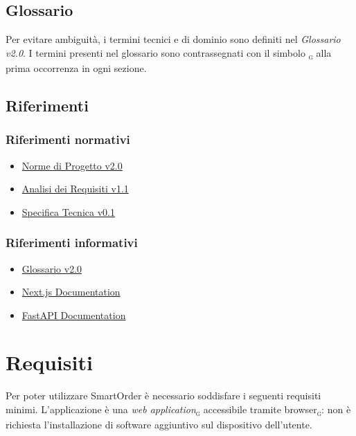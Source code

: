 \documentclass[a4paper, 11pt, oneside]{scrartcl}
\begin{document}
\subsection{Glossario}
Per evitare ambiguit\`a, i termini tecnici e di dominio sono definiti nel \textit{Glossario v2.0}.
I termini presenti nel glossario sono contrassegnati con il simbolo \textsubscript{\textsc{g}} alla prima occorrenza in ogni sezione.

\subsection{Riferimenti}

\subsubsection{Riferimenti normativi}
\begin{itemize}
    \item \href{https://swenightpro.github.io/Documentazione/docs/RTB/Documentazione%20Interna/Norme_di_Progetto_v2.0.pdf}{Norme di Progetto v2.0}
    \item \href{https://swenightpro.github.io/Documentazione/docs/RTB/Documentazione%20Esterna/Analisi_dei_Requisiti_v1.1.pdf}{Analisi dei Requisiti v1.1}
    \item \href{https://swenightpro.github.io/Documentazione/docs/PB/Documentazione%20Esterna/Specifica_Tecnica_v0.1.pdf}{Specifica Tecnica v0.1}
\end{itemize}

\subsubsection{Riferimenti informativi}
\begin{itemize}
    \item \href{https://swenightpro.github.io/Documentazione/docs/RTB/Documentazione%20Esterna/Glossario_v2.0.pdf}{Glossario v2.0}
    \item \href{https://nextjs.org/docs}{Next.js Documentation}
    \item \href{https://fastapi.tiangolo.com/}{FastAPI Documentation}
\end{itemize}

\newpage

\section{Requisiti}
Per poter utilizzare SmartOrder \`e necessario soddisfare i seguenti requisiti minimi. L'applicazione \`e una \textit{web application}\textsubscript{\textsc{g}} accessibile tramite browser\textsubscript{\textsc{g}}: non \`e richiesta l'installazione di software aggiuntivo sul dispositivo dell'utente.
\end{document}
